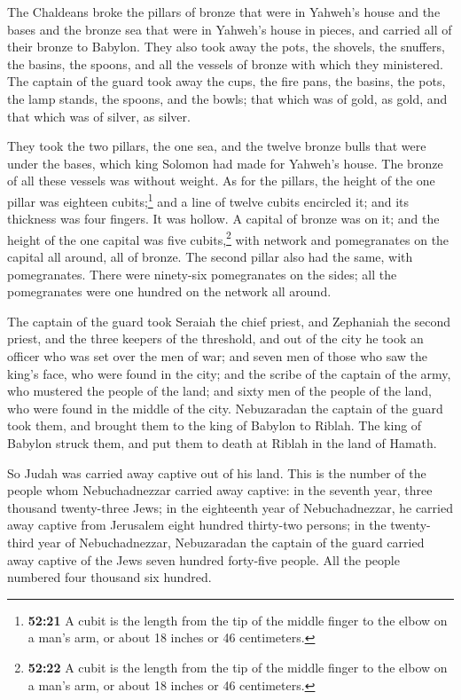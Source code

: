  The Chaldeans broke the pillars of bronze that were in
Yahweh's house and the bases and the bronze sea that were in Yahweh's
house in pieces, and carried all of their bronze to Babylon.
 They also took away the pots, the shovels, the snuffers,
the basins, the spoons, and all the vessels of bronze with which they
ministered.  The captain of the guard took away the cups,
the fire pans, the basins, the pots, the lamp stands, the spoons, and
the bowls; that which was of gold, as gold, and that which was of
silver, as silver.

 They took the two pillars, the one sea, and the twelve
bronze bulls that were under the bases, which king Solomon had made for
Yahweh's house. The bronze of all these vessels was without weight.
 As for the pillars, the height of the one pillar was
eighteen cubits;\footnote{\textbf{52:21} A cubit is the length from the
  tip of the middle finger to the elbow on a man's arm, or about 18
  inches or 46 centimeters.} and a line of twelve cubits encircled it;
and its thickness was four fingers. It was hollow.  A
capital of bronze was on it; and the height of the one capital was five
cubits,\footnote{\textbf{52:22} A cubit is the length from the tip of
  the middle finger to the elbow on a man's arm, or about 18 inches or
  46 centimeters.} with network and pomegranates on the capital all
around, all of bronze. The second pillar also had the same, with
pomegranates.  There were ninety-six pomegranates on the
sides; all the pomegranates were one hundred on the network all around.

 The captain of the guard took Seraiah the chief priest,
and Zephaniah the second priest, and the three keepers of the threshold,
 and out of the city he took an officer who was set over
the men of war; and seven men of those who saw the king's face, who were
found in the city; and the scribe of the captain of the army, who
mustered the people of the land; and sixty men of the people of the
land, who were found in the middle of the city. 
Nebuzaradan the captain of the guard took them, and brought them to the
king of Babylon to Riblah.  The king of Babylon struck
them, and put them to death at Riblah in the land of Hamath.

So Judah was carried away captive out of his land.  This
is the number of the people whom Nebuchadnezzar carried away captive: in
the seventh year, three thousand twenty-three Jews;  in
the eighteenth year of Nebuchadnezzar, he carried away captive from
Jerusalem eight hundred thirty-two persons;  in the
twenty-third year of Nebuchadnezzar, Nebuzaradan the captain of the
guard carried away captive of the Jews seven hundred forty-five people.
All the people numbered four thousand six hundred.

